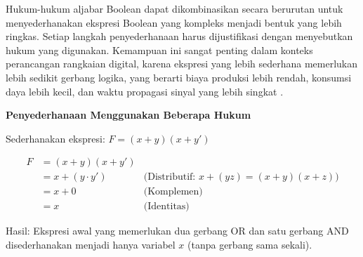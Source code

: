 Hukum-hukum aljabar Boolean dapat dikombinasikan secara berurutan untuk menyederhanakan ekspresi Boolean yang kompleks menjadi bentuk yang lebih ringkas. Setiap langkah penyederhanaan harus dijustifikasi dengan menyebutkan hukum yang digunakan. Kemampuan ini sangat penting dalam konteks perancangan rangkaian digital, karena ekspresi yang lebih sederhana memerlukan lebih sedikit gerbang logika, yang berarti biaya produksi lebih rendah, konsumsi daya lebih kecil, dan waktu propagasi sinyal yang lebih singkat \cite{allaboutcircuits_boolean}.

\begin{contoh}
\textbf{Penyederhanaan Menggunakan Beberapa Hukum}

Sederhanakan ekspresi: $F = (x + y)(x + y')$

\begin{align*}
F &= (x + y)(x + y') \\
  &= x + (y \cdot y') & \text{(Distributif: } x + (yz) = (x+y)(x+z) \text{)} \\
  &= x + 0 & \text{(Komplemen)} \\
  &= x & \text{(Identitas)}
\end{align*}

Hasil: Ekspresi awal yang memerlukan dua gerbang OR dan satu gerbang AND disederhanakan menjadi hanya variabel $x$ (tanpa gerbang sama sekali).
\end{contoh}
